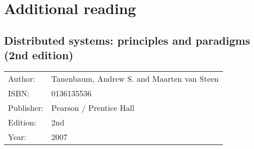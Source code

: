 \section*{Additional reading}

\subsection*{Distributed systems: principles and paradigms (2nd edition)}
\begin{tabular}{l l}
	Author: & Tanenbaum, Andrew S. and Maarten van Steen\\
	ISBN: & 0136135536\\
	Publisher: & Pearson / Prentice Hall\\
	Edition: & 2nd\\
	Year: & 2007\\
\end{tabular}